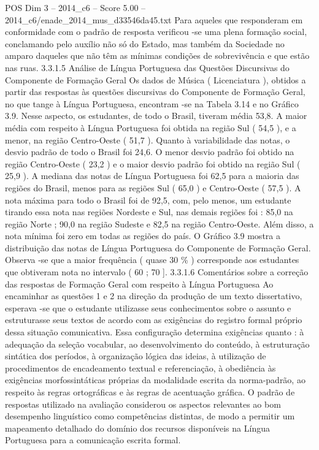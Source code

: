 \begin{textsample}{POS Dim 3 – 2014\_c6 – Score 5.00 – 2014\_c6/enade\_2014\_mus\_d33546da45.txt}
Para aqueles que responderam em conformidade com o padrão de resposta verificou -se uma plena formação social, conclamando pelo auxílio não só do Estado, mas também da Sociedade no amparo daqueles que não têm as mínimas condições de sobrevivência e que estão nas ruas. 3.3.1.5 Análise de Língua Portuguesa das Questões Discursivas do Componente de Formação Geral Os dados de Música ( Licenciatura ), obtidos a partir das respostas às questões discursivas do Componente de Formação Geral, no que tange à Língua Portuguesa, encontram -se na Tabela 3.14 e no Gráfico 3.9.
Nesse aspecto, os estudantes, de todo o Brasil, tiveram média 53,8.
A maior média com respeito à Língua Portuguesa foi obtida na região Sul ( 54,5 ), e a menor, na região Centro-Oeste ( 51,7 ).
Quanto à variabilidade das notas, o desvio padrão de todo o Brasil foi 24,6.
O menor desvio padrão foi obtido na região Centro-Oeste ( 23,2 ) e o maior desvio padrão foi obtido na região Sul ( 25,9 ).
A mediana das notas de Língua Portuguesa foi 62,5 para a maioria das regiões do Brasil, menos para as regiões Sul ( 65,0 ) e Centro-Oeste ( 57,5 ).
A nota máxima para todo o Brasil foi de 92,5, com, pelo menos, um estudante tirando essa nota nas regiões Nordeste e Sul, nas demais regiões foi : 85,0 na região Norte ; 90,0 na região Sudeste e 82,5 na região Centro-Oeste.
Além disso, a nota mínima foi zero em todas as regiões do país.
O Gráfico 3.9 mostra a distribuição das notas de Língua Portuguesa do Componente de Formação Geral.
Observa -se que a maior frequência ( quase 30 \% ) corresponde aos estudantes que obtiveram nota no intervalo ( 60 ; 70 ]. 3.3.1.6 Comentários sobre a correção das respostas de Formação Geral com respeito à Língua Portuguesa Ao encaminhar as questões 1 e 2 na direção da produção de um texto dissertativo, esperava -se que o estudante utilizasse seus conhecimentos sobre o assunto e estruturasse seus textos de acordo com as exigências do registro formal próprio dessa situação comunicativa.
Essa configuração determina exigências quanto : à adequação da seleção vocabular, ao desenvolvimento do conteúdo, à estruturação sintática dos períodos, à organização lógica das ideias, à utilização de procedimentos de encadeamento textual e referenciação, à obediência às exigências morfossintáticas próprias da modalidade escrita da norma-padrão, ao respeito às regras ortográficas e às regras de acentuação gráfica.
O padrão de respostas utilizado na avaliação considerou os aspectos relevantes ao bom desempenho linguístico como competências distintas, de modo a permitir um mapeamento detalhado do domínio dos recursos disponíveis na Língua Portuguesa para a comunicação escrita formal.

\end{textsample}
